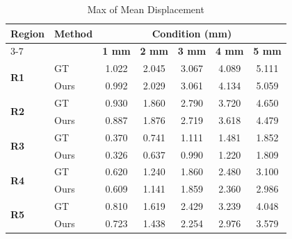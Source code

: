 \documentclass{article}
\begin{document}
\thispagestyle{empty}

\begin{table}[h]
\centering
\caption{Max of Mean Displacement}
\vspace{0.3cm}
\begin{tabular}{llccccc}
\toprule
\textbf{Region} & \textbf{Method} & \multicolumn{5}{c}{\textbf{Condition (mm)}} \\
\cmidrule(lr){3-7}
& & \textbf{1 mm} & \textbf{2 mm} & \textbf{3 mm} & \textbf{4 mm} & \textbf{5 mm} \\
\midrule
\multirow{2}{*}{\textbf{R1}} & GT  & 1.022 & 2.045 & 3.067 & 4.089 & 5.111 \\
 & Ours  & 0.992 & 2.029 & 3.061 & 4.134 & 5.059 \\ \midrule
\multirow{2}{*}{\textbf{R2}} & GT  & 0.930 & 1.860 & 2.790 & 3.720 & 4.650 \\
 & Ours  & 0.887 & 1.876 & 2.719 & 3.618 & 4.479 \\ \midrule
\multirow{2}{*}{\textbf{R3}} & GT  & 0.370 & 0.741 & 1.111 & 1.481 & 1.852 \\
 & Ours  & 0.326 & 0.637 & 0.990 & 1.220 & 1.809 \\ \midrule
\multirow{2}{*}{\textbf{R4}} & GT  & 0.620 & 1.240 & 1.860 & 2.480 & 3.100 \\
 & Ours  & 0.609 & 1.141 & 1.859 & 2.360 & 2.986 \\ \midrule
\multirow{2}{*}{\textbf{R5}} & GT  & 0.810 & 1.619 & 2.429 & 3.239 & 4.048 \\
 & Ours  & 0.723 & 1.438 & 2.254 & 2.976 & 3.579 \\
\bottomrule
\end{tabular}
\end{table}
\end{document}
